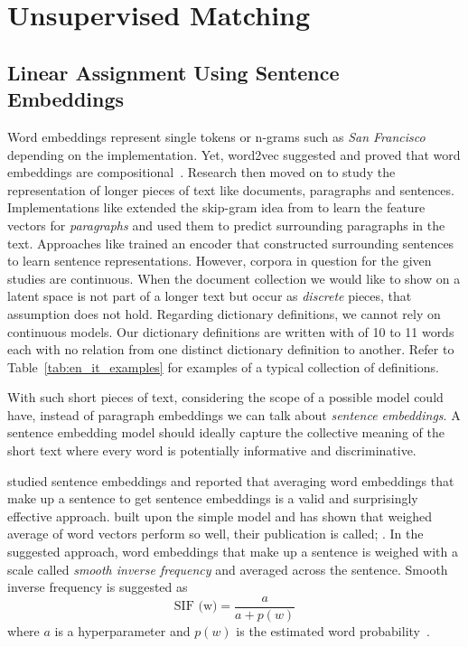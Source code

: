 \chapter{Unsupervised Matching}%
\label{chap:unsupervised_matching}

\section{Linear Assignment Using Sentence Embeddings}%
\label{sec:linear_assignment_using_sentence_embeddings}

Word embeddings represent single tokens or n-grams such as \emph{San Francisco} depending on the implementation.
Yet, word2vec suggested and proved that word embeddings are compositional~\cite{mikolovDistributed2013}.
Research then moved on to study the representation of longer pieces of text like documents, paragraphs and sentences.
Implementations like \textcite{le_distributed_2014} extended the skip-gram idea from \textcite{mikolovDistributed2013} to learn the feature vectors for \emph{paragraphs} and used them to predict surrounding paragraphs in the text.
Approaches like \textcite{kiros_skip-thought_2015} trained an encoder that constructed surrounding sentences to learn sentence representations.
However, corpora in question for the given studies are continuous.
When the document collection we would like to show on a latent space is not part of a longer text but occur as \emph{discrete} pieces, that assumption does not hold.
Regarding dictionary definitions, we cannot rely on continuous models.
Our dictionary definitions are written with of 10 to 11 words each with no relation from one distinct dictionary definition to another.
Refer to Table~\ref{tab:en_it_examples} for examples of a typical collection of definitions.

With such short pieces of text, considering the scope of a possible model could have, instead of paragraph embeddings we can talk about \emph{sentence embeddings}.
A sentence embedding model should ideally capture the collective meaning of the short text where every word is potentially informative and discriminative.

\textcite{wieting_towards_2015} studied sentence embeddings and reported that averaging word embeddings that make up a sentence to get sentence embeddings is a valid and surprisingly effective approach.
\textcite{aroraSimple2016} built upon the simple model and has shown that weighed average of word vectors perform so well, their publication is called; .
In the suggested approach, word embeddings that make up a sentence is weighed with a scale called \emph{smooth inverse frequency} and averaged across the sentence.
Smooth inverse frequency is suggested as
\begin{displaymath}
    \text{SIF (w)} = \frac{a}{a + p(w)}
\end{displaymath}
where $a$ is a hyperparameter and $p(w)$ is the estimated word probability~\cite{aroraSimple2016}.

